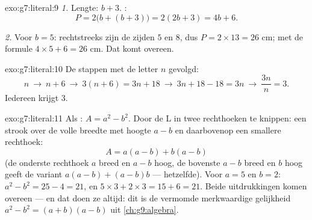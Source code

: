 \begin{solution}{exo:g7:literal:9}
\emph{1.} Lengte: $b + 3$. :
\[
P = 2\bigl(b + (b + 3)\bigr) = 2(2b + 3) = 4b + 6 .
\]

\emph{2.} Voor $b = 5$: rechtstreeks zijn de zijden $5$ en $8$, dus
$P = 2 \times 13 = 26$ cm; met de formule $4 \times 5 + 6 = 26$ cm. Dat komt
overeen.
\end{solution}

\begin{solution}{exo:g7:literal:10}
De stappen met de letter $n$ gevolgd:
\[
n \ \to\ n + 6 \ \to\ 3(n + 6) = 3n + 18 \ \to\ 3n + 18 - 18 = 3n
\ \to\ \frac{3n}{n} = 3 .
\]
Iedereen krijgt $3$.
\end{solution}

\begin{solution}{exo:g7:literal:11}
Als : $A = a^2 - b^2$. Door de L in twee rechthoeken te knippen: een strook
over de volle breedte met hoogte $a - b$ en daarbovenop een smallere rechthoek:
\[
A = a(a - b) + b(a - b)
\]
(de onderste rechthoek $a$ breed en $a - b$ hoog, de bovenste $a - b$ breed en $b$
hoog geeft de variant $a(a-b) + (a-b)b$ --- hetzelfde). Voor $a = 5$ en $b = 2$:
$a^2 - b^2 = 25 - 4 = 21$, en $5 \times 3 + 2 \times 3 = 15 + 6 = 21$. Beide
uitdrukkingen komen overeen --- en dat doen ze altijd: dit is de vermomde
merkwaardige gelijkheid $a^2 - b^2 = (a + b)(a - b)$ uit
\cref{ch:g9:algebra}.
\end{solution}

